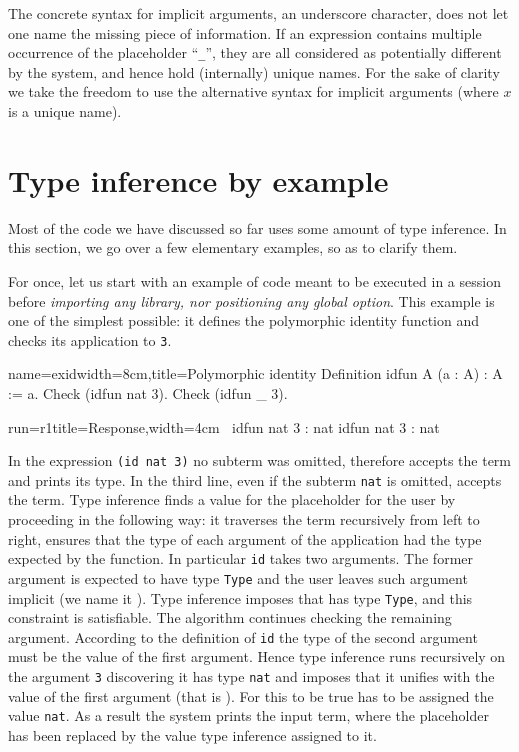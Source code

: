 The concrete syntax for implicit arguments, an underscore character,
does not let one name the missing piece of information.
If an expression contains multiple occurrence
of the placeholder ``\lstinline/_/'', they are all considered as
potentially different by the system, and hence hold (internally)
unique names.  For the sake of clarity we take the freedom to
use the alternative syntax  for implicit arguments (where
$x$ is a unique name).

\section{Type inference by example}
Most of the code we have discussed so far uses some amount of type
inference. In this section, we go over a few elementary examples, so
as to clarify them.

For once, let us start with an example of code meant to be executed in
a \Coq{} session before \emph{importing any library, nor positioning any
global option}. This example is one of the simplest possible: it
defines the polymorphic identity function and checks its application to
\lstinline/3/.

\begin{coq-left}{name=exid}{width=8cm,title=Polymorphic identity}
Definition idfun A (a : A) : A := a.
Check (idfun nat 3).
Check (idfun _ 3).
\end{coq-left}
\begin{coqout-right}{run=r1}{title=Response,width=4cm}
$~$
idfun nat 3 : nat
idfun nat 3 : nat
\end{coqout-right}

In the expression \lstinline/(id nat 3)/ no subterm was omitted,
therefore \Coq{} accepts the term and prints its type.  In the third
line, even if the subterm \lstinline/nat/ is omitted, \Coq{} accepts
the term.  Type inference finds a value for the placeholder
for the user by proceeding in the following way:  it traverses the term
recursively from left to right, ensures that the type of each
argument of the application had the type expected by the function.  In
particular \lstinline/id/ takes two arguments.
The former argument is expected to have type \lstinline/Type/ and the
user leaves such argument implicit (we name it ).   Type
inference imposes that  has type \lstinline/Type/, and this
constraint is satisfiable.  The algorithm continues checking the
remaining argument.  According to the definition of \lstinline/id/ the type of
the second argument must be the value of the first argument.  Hence
type inference runs recursively on the argument \lstinline/3/
discovering it has type \lstinline/nat/ and imposes that it unifies
with the value of the first argument (that is ).  For this
to be true  has to be assigned the value \lstinline/nat/.
As a result the system prints the input term, where the placeholder
has been replaced by the value type inference assigned to it.

